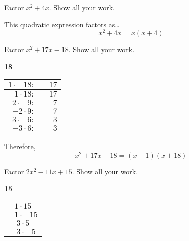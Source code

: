 \documentclass[11pt,letterpaper]{article}
\begin{document}
\newpage





 Factor $x^2 + 4x$. Show all your work. \pspace

\sol This quadratic expression factors as\dots
	\[
	x^2 + 4x= x(x + 4)
	\]





\newpage





 Factor $x^2 + 17x - 18$. Show all your work. \pspace

\sol 
	\begin{table}[!ht]
	\centering
	\underline{\bfseries 18} \pvspace{0.1cm}
	\begin{tabular}{rr}
	$1 \cdot -18 \colon$ & $-17$ \\ \hline
	\multicolumn{1}{|r}{$-1 \cdot 18 \colon$} & \multicolumn{1}{r|}{$17$} \\ \hline
	$2 \cdot -9 \colon$ & $-7$ \\
	$-2 \cdot 9 \colon$ & $7$ \\
	$3 \cdot -6 \colon$ & $-3$ \\
	$-3 \cdot 6 \colon$ & $3$ \\
	\end{tabular}
	\end{table}

Therefore,
	\[
	x^2 + 17x - 18= (x - 1)(x + 18)
	\]




\newpage





 Factor $2x^2 - 11x + 15$. Show all your work. \pspace

\sol 
	\begin{table}[!ht]
	\centering
	\underline{\bfseries 15} \pvspace{0.1cm}
	\begin{tabular}{c}
	$1 \cdot 15$ \\
	$-1 \cdot -15$ \\
	$3 \cdot 5$ \\
	$-3 \cdot -5$
	\end{tabular}
	\end{table}
\end{document}
